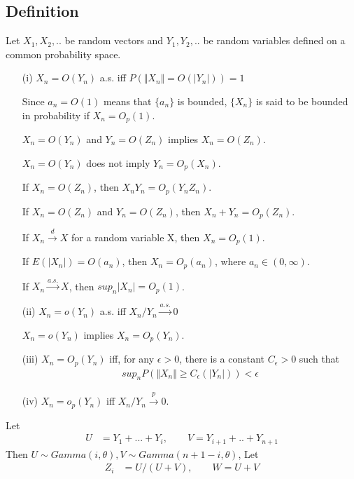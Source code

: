 \documentclass[11pt]{article} %
\begin{document}
\subsection{Definition}
Let $X_1, X_2,..$ be random vectors and $Y_1, Y_2,..$ be random variables defined on a common probability space.
\begin{itemize}
\item[(i)] $X_n = O(Y_n)$ a.s. iff $P(\Vert  X_n\Vert = O(|Y_n|)) = 1$

Since $a_n = O(1)$ means that $\{ a_n \}$ is bounded, $\{ X_n\}$ is said to be bounded in probability if $X_n = O_p(1)$. 

$X_n = O(Y_n)$ and $Y_n = O(Z_n)$ implies $X_n = O(Z_n)$.

$X_n = O(Y_n)$ does not imply $Y_n = O_p(X_n)$.

If $X_n = O(Z_n)$, then $X_nY_n = O_p(Y_n Z_n)$.

If $X_n = O(Z_n)$ and $Y_n = O(Z_n)$, then $X_n + Y_n = O_p(Z_n)$.

If $X_n \xrightarrow {d} X$ for a random variable X, then $X_n = O_p(1)$.

If $E(|X_n|) = O(a_n)$, then $X_n = O_p(a_n)$, where $a_n \in (0, \infty)$.

If $X_n \xrightarrow {a.s.} X$, then $sup_n|X_n| = O_p(1)$.

\item[(ii)] $X_n = o(Y_n)$ a.s. iff $ X_n/Y_n \xrightarrow {a.s.} 0$

$X_n = o(Y_n)$ implies $X_n = O_p(Y_n)$.

\item[(iii)] $X_n = O_p(Y_n)$ iff, for any $\epsilon > 0$, there is a constant $C_{\epsilon} > 0$ such that 
 \begin{align*}
   sup_n P(\Vert  X_n\Vert \geq C_{\epsilon}(|Y_n|)) < \epsilon
\end{align*}

\item[(iv)] $X_n = o_p(Y_n)$ iff $X_n/Y_n \xrightarrow {p} 0$.


\end{itemize}


Let 
\begin{align*}
	U &=Y_1 + ...+ Y_i, \qquad V= Y_{i+1}+ .. + Y_{n+1} 
\end{align*}
Then $U \sim Gamma(i, \theta), V \sim Gamma(n+1-i, \theta)$, Let
\begin{align*}
 	Z_i &= U/(U+V), \qquad W = U+V 
\end{align*}
\end{document}
